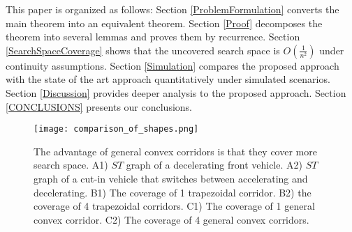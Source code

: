 This paper is organized as follows: Section \ref{ProblemFormulation} converts the main theorem into an equivalent theorem. Section \ref{Proof} decomposes the theorem into several lemmas and proves them by recurrence. Section \ref{SearchSpaceCoverage} shows that the uncovered search space is $O(\frac{1}{n^2})$ under continuity assumptions. Section \ref{Simulation} compares the proposed approach with the state of the art approach quantitatively under simulated scenarios. Section \ref{Discussion} provides deeper analysis to the proposed approach. Section \ref{CONCLUSIONS} presents our conclusions.

\begin{figure}[tbp]
\begin{center}
\texttt{[image: comparison\_of\_shapes.png]}
\end{center}
\vspace{-0.2 in}
\caption{The advantage of general convex corridors is that they cover more search space. A1) $ST$ graph of a decelerating front vehicle. A2) $ST$ graph of a cut-in vehicle that switches between accelerating and decelerating. B1) The coverage of 1 trapezoidal corridor. B2) the coverage of 4 trapezoidal corridors. C1) The coverage of 1 general convex corridor. C2) The coverage of 4 general convex corridors.}
\label{Fig:comparison_of_shapes}
\vspace{-0.2 in}
\end{figure}